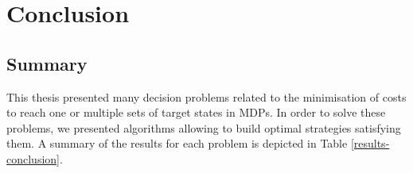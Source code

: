 \chapter*{Conclusion}

\section*{Summary}

This thesis presented many decision problems related to the minimisation of costs to reach one or multiple sets of target states in MDPs.
In order to solve these problems, we presented algorithms allowing to build optimal strategies satisfying them.
A summary of the results for each problem is depicted in Table \ref{results-conclusion}.\\

